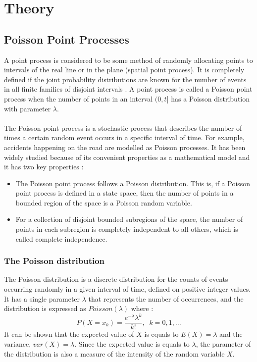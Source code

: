 \chapter{Theory} \label{ch:theory}

\section{Poisson Point Processes}
A point process is considered to be some method of randomly allocating points to intervals of the real line or in the plane (spatial point process). It is completely defined if the joint probability distributions are known for the number of events in all finite families of disjoint intervals \cite{daley}. A point process is called a Poisson point process when the number of points in an interval $(0,t]$ has a Poisson distribution with parameter $\lambda$.
\\
\\
The Poisson point process  is a stochastic process that describes the number of times a certain random event occurs in a specific interval of time. For example, accidents happening on the road are modelled as Poisson processes. It has been widely studied because of its convenient properties as a mathematical model and it has two key properties \cite{daley}:
\begin{itemize}
    \item The Poisson point process follows a Poisson distribution. This is, if a Poisson point process is defined in a state space, then the number of points in a bounded region of the space is a Poisson random variable. 
    \item For a collection of disjoint bounded subregions of the space, the number of points in each subregion is completely independent to all others, which is called complete independence.
\end{itemize}


\subsection{The Poisson distribution}
The Poisson distribution is a discrete distribution for the counts of events occurring randomly in a given interval of time, defined on positive integer values. It has a single parameter $\lambda$ that represents the number of occurrences, and the distribution is expressed as $Poisson(\lambda)$ where \cite{feller}:
\begin{equation}
    P(X=x_k) = \frac{e^{-\lambda}\lambda^k}{k!}, \;\; k=0,1,...
\end{equation}
It can be shown \cite{mishra} that the expected value of $X$ is equals to $ E(X) = \lambda $ and the variance, $var(X) = \lambda $. Since the expected value is equals to $\lambda$, the parameter of the distribution is also a measure of the intensity of the random variable $X$.


